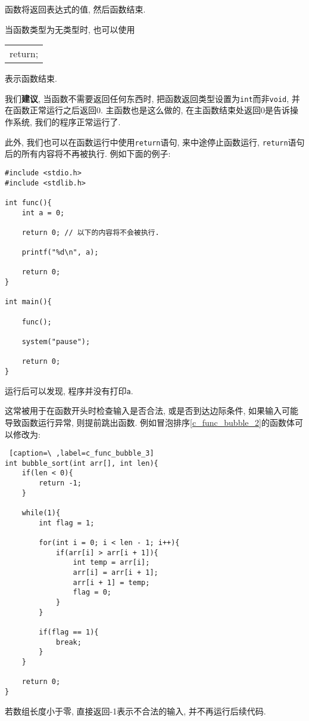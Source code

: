         函数将返回表达式的值, 然后函数结束.

        当函数类型为无类型时, 也可以使用
        \begin{center}
        \begin{longtable}{l}
            return;
        \end{longtable}
        \end{center}
        表示函数结束.

        我们\textbf{建议}, 当函数不需要返回任何东西时, 把函数返回类型设置为\texttt{int}而非\texttt{void}, 并在函数正常运行之后返回0. 主函数也是这么做的, 在主函数结束处返回0是告诉操作系统, 我们的程序正常运行了.

        此外, 我们也可以在函数运行中使用\texttt{return}语句, 来中途停止函数运行, \texttt{return}语句后的所有内容将不再被执行. 例如下面的例子:
\begin{lstlisting}
#include <stdio.h>
#include <stdlib.h>

int func(){
    int a = 0;

    return 0; // 以下的内容将不会被执行.

    printf("%d\n", a);

    return 0;
}

int main(){

    func();

    system("pause");

    return 0;
}
\end{lstlisting}

        运行后可以发现, 程序并没有打印\texttt{a}.

        这常被用于在函数开头时检查输入是否合法, 或是否到达边际条件, 如果输入可能导致函数运行异常, 则提前跳出函数. 例如冒泡排序\ref{c_func_bubble_2}的函数体可以修改为:
\begin{lstlisting} [caption=\ ,label=c_func_bubble_3]
int bubble_sort(int arr[], int len){
    if(len < 0){
        return -1;
    }

    while(1){
        int flag = 1;

        for(int i = 0; i < len - 1; i++){
            if(arr[i] > arr[i + 1]){
                int temp = arr[i];
                arr[i] = arr[i + 1];
                arr[i + 1] = temp;
                flag = 0;
            }
        }

        if(flag == 1){
            break;
        }
    }

    return 0;
}
\end{lstlisting}

        若数组长度小于零, 直接返回-1表示不合法的输入, 并不再运行后续代码.

